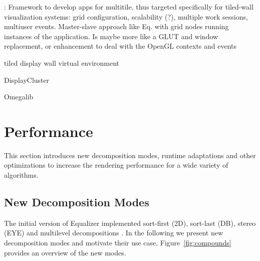 \documentclass[10pt,journal,compsoc]{IEEEtran}
\newcommand{\fig}[1]{Figure~\ref{#1}}
\begin{document}
\cite{DK:11}: Framework to develop apps for multitile, thus targeted
specifically for tiled-wall visualization systems: grid configuration,
scalability (?), multiple work sessions, multiuser events. Master-slave approach
like Eq. with grid nodes running instances of the application. Is maybe more
like a GLUT and window replacement, or enhancement to deal with the OpenGL
contexts and events

\cite{CKP:12} tiled display wall virtual environment

\cite{TBD} DisplayCluster

Omegalib

\section{Performance}

This section introduces new decomposition modes, runtime adaptations and other
optimizations to increase the rendering performance for a wide variety of
algorithms.

\subsection{New Decomposition Modes}

The initial version of Equalizer implemented sort-first (2D), sort-last (DB),
stereo (EYE) and multilevel decompositions \cite{EMP:09}. In the following we present new
decomposition modes and motivate their use case. \fig{fig:compounds} provides an
overview of the new modes.
\end{document}
